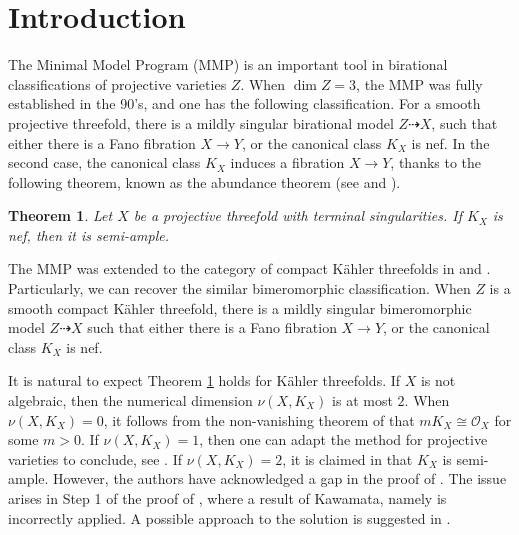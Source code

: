 \documentclass[12pt]{amsart}
\newcommand{\<}{\leq}
\def\mcO{\mathcal{O}}
\newtheorem{theorem}{Theorem}[section]
\theoremstyle{remark}
\theoremstyle{definition}
\theoremstyle{definition}
\numberwithin{equation}{section}
\theoremstyle{definition}
\theoremstyle{definition}
\def\dim{\operatorname{dim}}
\begin{document}
\tableofcontents


\section{Introduction}
 

The Minimal Model Program (MMP) is an important tool in   birational classifications of projective varieties $Z$. 
When $\dim Z = 3$, the MMP was fully established in the 90's, and one has the following classification. 
For a smooth projective threefold, there is a mildly singular birational model $Z\dashrightarrow X$, such that 
either there is a Fano fibration $X\to Y$, or the canonical class $K_{X}$ is nef. 
In the second case, the canonical class  $K_{X}$  induces a fibration $X\to Y$, thanks to the following theorem, known as the abundance theorem  (see \cite{Miy87, Miy88, Miy88b} and \cite{Kaw92}). 

\begin{theorem}
\label{thm:abundance-proj}
    Let $X$ be a projective threefold with terminal singularities. 
If $K_X$ is nef, then it is semi-ample. 
\end{theorem}



The MMP was extended to the category of compact K\"ahler threefolds in \cite{HP16} and \cite{HP15}. 
Particularly, we can recover the similar bimeromorphic classification. 
When $Z$ is a smooth compact K\"ahler threefold, there is a mildly singular bimeromorphic model $Z\dashrightarrow X$  such that 
either there is a Fano fibration $X\to Y$, or the canonical class $K_{X}$ is nef. 

 


It is natural to expect Theorem \ref{thm:abundance-proj} holds for K\"ahler threefolds. 
If $X$ is not algebraic, then  the numerical dimension $\nu(X, K_X)$ is at most $2$. 
When $\nu(X, K_X)=0$,  it follows from the non-vanishing theorem of \cite[Theorem 0.3]{DP03} that $mK_X \cong \mcO_X$ for some $m>0$. 
If $\nu(X, K_X)=1$, then one can adapt the method for projective varieties to conclude, see \cite[Section 8.A]{CHP16}. 
If  $\nu(X, K_X)=2$, it is claimed in \cite[Theorem 8.2]{CHP16} that $K_X$ is semi-ample. 
However, the authors have acknowledged a gap in the proof of \cite{CHP16}.
The issue arises in Step 1 of the proof of \cite[Theorem 8.2]{CHP16}, where a result
of Kawamata, namely \cite[Theorem 9.6]{Kaw88} is incorrectly applied.
A possible approach to the solution is suggested in \cite{CHP23}. \\
\end{document}
